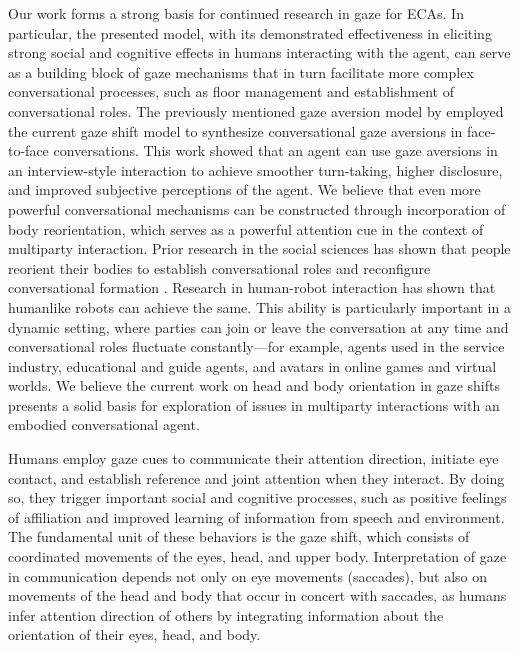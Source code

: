 Our work forms a strong basis for continued research in gaze for ECAs. In particular, the presented model, with its demonstrated effectiveness in eliciting strong social and cognitive effects in humans interacting with the agent, can serve as a building block of gaze mechanisms that in turn facilitate more complex conversational processes, such as floor management and establishment of conversational roles. The previously mentioned gaze aversion model by \citet{andrist2013aversion} employed the current gaze shift model to synthesize conversational gaze aversions in face-to-face conversations. This work showed that an agent can use gaze aversions in an interview-style interaction to achieve smoother turn-taking, higher disclosure, and improved subjective perceptions of the agent. We believe that even more powerful conversational mechanisms can be constructed through incorporation of body reorientation, which serves as a powerful attention cue in the context of multiparty interaction. Prior research in the social sciences has shown that people reorient their bodies to establish conversational roles and reconfigure conversational formation \cite{kendon1973visible,kendon2010spacing}. Research in human-robot interaction \cite{kuzuoka2010reconfiguring} has shown that humanlike robots can achieve the same. This ability is particularly important in a dynamic setting, where parties can join or leave the conversation at any time and conversational roles fluctuate constantly---for example, agents used in the service industry, educational and guide agents, and avatars in online games and virtual worlds. We believe the current work on head and body orientation in gaze shifts presents a solid basis for exploration of issues in multiparty interactions with an embodied conversational agent.


Humans employ gaze cues to communicate their attention direction, initiate eye contact, and establish reference and joint attention when they interact. By doing so, they trigger important social and cognitive processes, such as positive feelings of affiliation and improved learning of information from speech and environment. The fundamental unit of these behaviors is the gaze shift, which consists of coordinated movements of the eyes, head, and upper body. Interpretation of gaze in communication depends not only on eye movements (saccades), but also on movements of the head and body that occur in concert with saccades, as humans infer attention direction of others by integrating information about the orientation of their eyes, head, and body.

